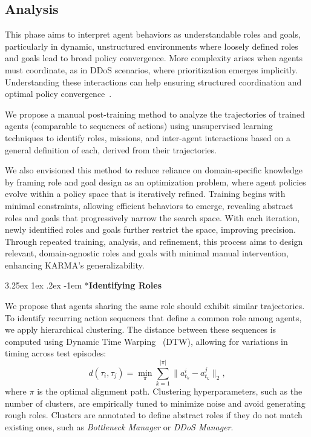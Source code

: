 \documentclass[conference]{IEEEtran}
\makeatletter
\renewcommand\paragraph{\@startsection{paragraph}{5}{\z@}%
  {3.25ex \@plus1ex \@minus.2ex}%
  {-1em}%
  {\normalfont\normalsize\bfseries}}
\makeatother
\begin{document}
\subsection{Analysis}
\label{sec:analysis}

This phase aims to interpret agent behaviors as understandable roles and goals, particularly in dynamic, unstructured environments where loosely defined roles and goals lead to broad policy convergence. More complexity arises when agents must coordinate, as in DDoS scenarios, where prioritization emerges implicitly. Understanding these interactions can help ensuring structured coordination and optimal policy convergence~\cite{Shoham2009MAS}.

We propose a manual post-training method to analyze the trajectories of trained agents (comparable to sequences of actions) using unsupervised learning techniques to identify roles, missions, and inter-agent interactions based on a general definition of each, derived from their trajectories.

We also envisioned this method to reduce reliance on domain-specific knowledge by framing role and goal design as an optimization problem, where agent policies evolve within a policy space that is iteratively refined. Training begins with minimal constraints, allowing efficient behaviors to emerge, revealing abstract roles and goals that progressively narrow the search space. With each iteration, newly identified roles and goals further restrict the space, improving precision. Through repeated training, analysis, and refinement, this process aims to design relevant, domain-agnostic roles and goals with minimal manual intervention, enhancing KARMA's generalizability.

\paragraph*{\textbf{Identifying Roles}}

We propose that agents sharing the same role should exhibit similar trajectories. To identify recurring action sequences that define a common role among agents, we apply hierarchical clustering. The distance between these sequences is computed using Dynamic Time Warping~\cite{berndt1994using} (DTW), allowing for variations in timing across test episodes:
\[
    d(\tau_i, \tau_j) = \min_{\pi} \sum_{k=1}^{|\pi|} \|a_{t_k}^i - a_{t_k}^j\|_2,
\]
where $\pi$ is the optimal alignment path. Clustering hyperparameters, such as the number of clusters, are empirically tuned to minimize noise and avoid generating rough roles. Clusters are annotated to define abstract roles if they do not match existing ones, such as \textit{Bottleneck Manager} or \textit{DDoS Manager}.
\end{document}

